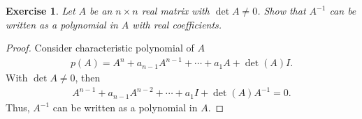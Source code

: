 \documentclass[11pt]{book}
\newtheorem{exercise}{Exercise}[section]
\theoremstyle{definition}
\numberwithin{equation}{subsection}
\begin{document}
\medskip

\begin{exercise}
Let $A$ be an $n \times n$ real matrix with $\det A \neq 0$. Show that $A^{-1}$ can be written as a polynomial in $A$ with real coefficients.
\end{exercise}
\begin{proof}
Consider characteristic polynomial of $A$
\begin{align*}
    p(A) = A^n + a_{n-1}A^{n-1} + \cdots + a_1 A + \det(A)I.
\end{align*}
With $\det A \neq 0$, then
\begin{align*}
    A^{n-1} + a_{n-1}A^{n-2} + \cdots + a_1 I + \det(A) A^{-1} = 0.
\end{align*}
Thus, $A^{-1}$ can be written as a polynomial in $A$.
\end{proof}

\medskip
\end{document}
